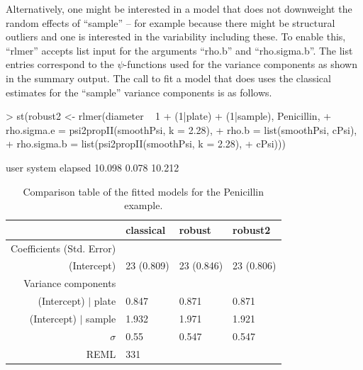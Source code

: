 \documentclass[11pt, a4paper]{article}
\renewenvironment{Schunk}{\vspace{\topsep}}{\vspace{\topsep}}
\theoremstyle{note}
\begin{document}
Alternatively, one might be interested in a model that does not downweight
the random effects of ``sample'' -- for example because there might be
structural outliers and one is interested in the variability including
these. To enable this, ``rlmer'' accepts list input for the arguments
``rho.b'' and ``rho.sigma.b''. The list entries correspond to the
$\psi$-functions used for the variance components as shown in the summary
output. The call to fit a model that does uses the classical estimates for
the ``sample'' variance components is as follows.

\begin{Schunk}
\begin{Sinput}
> st(robust2 <- rlmer(diameter ~ 1 + (1|plate) + (1|sample), Penicillin,
+                     rho.sigma.e = psi2propII(smoothPsi, k = 2.28),
+                     rho.b = list(smoothPsi, cPsi),
+                     rho.sigma.b = list(psi2propII(smoothPsi, k = 2.28),
+                                        cPsi)))
\end{Sinput}
\begin{Soutput}
   user  system elapsed 
 10.098   0.078  10.212 
\end{Soutput}
\end{Schunk}
\begin{table}[ht]
\centering
{\small
\begin{tabular}{rlll}
  \hline
  & classical & robust & robust2 \\ 
  \hline
Coefficients (Std. Error) &  &  &  \\ 
  (Intercept) & 23 (0.809) & 23 (0.846) & 23 (0.806) \\ 
   \hline
Variance components &  &  &  \\ 
  (Intercept) $|$ plate & 0.847 & 0.871 & 0.871 \\ 
  (Intercept) $|$ sample & 1.932 & 1.971 & 1.921 \\ 
   \hline
$\sigma$ & 0.55 & 0.547 & 0.547 \\ 
   \hline
REML & 331 &  &  \\ 
   \hline
\end{tabular}
}
\caption{Comparison table of the fitted models for the Penicillin example.} 
\label{tab:cmpPenicillin}
\end{table}
\end{document}
